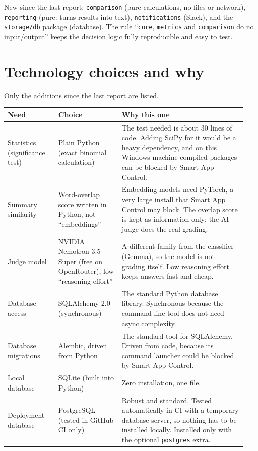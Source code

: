 \documentclass[11pt,a4paper]{article}
\newcommand{\code}[1]{\nolinkurl{#1}}
\begin{document}
New since the last report: \code{comparison} (pure calculations, no files or network),
\code{reporting} (pure: turns results into text), \code{notifications} (Slack), and the
\code{storage/db} package (database). The rule ``\code{core}, \code{metrics} and
\code{comparison} do no input/output'' keeps the decision logic fully reproducible and easy
to test.

\section{Technology choices and why}

Only the additions since the last report are listed.

\begin{longtable}{@{}p{0.20\linewidth}p{0.25\linewidth}p{0.49\linewidth}@{}}
\toprule
\textbf{Need} & \textbf{Choice} & \textbf{Why this one} \\
\midrule
\endhead
Statistics (significance test) & Plain Python (exact binomial calculation) & The test needed is about 30 lines of code. Adding SciPy for it would be a heavy dependency, and on this Windows machine compiled packages can be blocked by Smart App Control. \\
Summary similarity & Word-overlap score written in Python, not ``embeddings'' & Embedding models need PyTorch, a very large install that Smart App Control may block. The overlap score is kept as information only; the AI judge does the real grading. \\
Judge model & NVIDIA Nemotron 3.5 Super (free on OpenRouter), low ``reasoning effort'' & A different family from the classifier (Gemma), so the model is not grading itself. Low reasoning effort keeps answers fast and cheap. \\
Database access & SQLAlchemy 2.0 (synchronous) & The standard Python database library. Synchronous because the command-line tool does not need async complexity. \\
Database migrations & Alembic, driven from Python & The standard tool for SQLAlchemy. Driven from code, because its command launcher could be blocked by Smart App Control. \\
Local database & SQLite (built into Python) & Zero installation, one file. \\
Deployment database & PostgreSQL (tested in GitHub CI only) & Robust and standard. Tested automatically in CI with a temporary database server, so nothing has to be installed locally. Installed only with the optional \code{postgres} extra. \\

\end{longtable}
\end{document}
